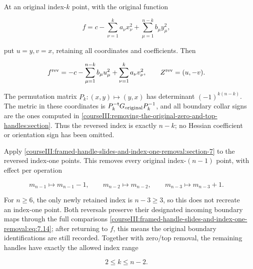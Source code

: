 At an original index-\(k\) point, with the original function

\begin{equation}
f=c-\sum_{\nu=1}^{k}a_\nu x_\nu^2
       +\sum_{\mu=1}^{n-k}b_\mu y_\mu^2,
 \label{courseIII:framed-handle-slides-and-index-one-removal:eq:8.2}
\end{equation}

put \(u=y,v=x\), retaining all coordinates and coefficients. Then

\begin{equation}
f^{\rm rev}
   =-c-\sum_{\mu=1}^{n-k}b_\mu u_\mu^2
             +\sum_{\nu=1}^{k}a_\nu v_\nu^2,\qquad
 Z^{\rm rev}=(u,-v).
 \label{courseIII:framed-handle-slides-and-index-one-removal:eq:8.3}
\end{equation}

The permutation matrix \(P_k:(x,y)\mapsto(y,x)\) has determinant
\((-1)^{k(n-k)}\). The metric in these coordinates is
\(P_k^{-\mathsf t}G_{\rm original}P_k^{-1}\), and all boundary collar signs are the ones computed in \cref{courseIII:removing-the-original-zero-and-top-handles:section}. Thus the reversed index is exactly \(n-k\); no Hessian coefficient or orientation sign has been omitted.

Apply \cref{courseIII:framed-handle-slides-and-index-one-removal:section-7} to the reversed index-one points. This removes every original index-\((n-1)\) point, with effect per operation

\begin{equation}
m_{n-1}\longmapsto m_{n-1}-1,\qquad
 m_{n-2}\longmapsto m_{n-2},\qquad
 m_{n-3}\longmapsto m_{n-3}+1.
 \label{courseIII:framed-handle-slides-and-index-one-removal:eq:8.4}
\end{equation}

For \(n\geq6\), the only newly retained index is \(n-3\geq3\), so this does not recreate an index-one point. Both reversals preserve their designated incoming boundary maps through the full comparisons \eqref{courseIII:framed-handle-slides-and-index-one-removal:eq:7.14}; after returning to \(f\), this means the original boundary identifications are still recorded. Together with zero/top removal, the remaining handles have exactly the allowed index range

\begin{equation}
2\leq k\leq n-2.
 \label{courseIII:framed-handle-slides-and-index-one-removal:eq:8.5}
\end{equation}

